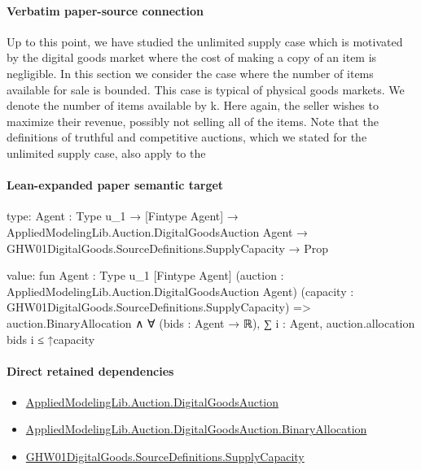 \documentclass[10pt]{article}
\begin{document}
\paragraph{Verbatim paper-source connection}
\begin{ReviewVerbatim}
Up to this point, we have studied the unlimited supply case which is motivated by the digital goods market where the cost of making a copy of an item is negligible. In this section we consider the case where the
number of items available for sale is bounded. This
case is typical of physical goods markets. We denote the number of items available by k. Here again,
the seller wishes to maximize their revenue, possibly
not selling all of the items. Note that the definitions of truthful and competitive auctions, which we
stated for the unlimited supply case, also apply to the
\end{ReviewVerbatim}



\paragraph{Lean-expanded paper semantic target}
\begin{ReviewVerbatim}
type:
{Agent : Type u_1} →
  [Fintype Agent] →
    AppliedModelingLib.Auction.DigitalGoodsAuction Agent → GHW01DigitalGoods.SourceDefinitions.SupplyCapacity → Prop

value:
fun {Agent : Type u_1} [Fintype Agent] (auction : AppliedModelingLib.Auction.DigitalGoodsAuction Agent)
    (capacity : GHW01DigitalGoods.SourceDefinitions.SupplyCapacity) =>
  auction.BinaryAllocation ∧ ∀ (bids : Agent → ℝ), ∑ i : Agent, auction.allocation bids i ≤ ↑capacity
\end{ReviewVerbatim}

\paragraph{Direct retained dependencies}
\begin{itemize}\raggedright
\item \hyperlink{governing-declaration-7d5372964da104c4}{Applied\allowbreak{}Modeling\allowbreak{}Lib.\allowbreak{}Auction.\allowbreak{}Digital\allowbreak{}Goods\allowbreak{}Auction}
\item \hyperlink{governing-declaration-db44fd9ee659d7f2}{Applied\allowbreak{}Modeling\allowbreak{}Lib.\allowbreak{}Auction.\allowbreak{}Digital\allowbreak{}Goods\allowbreak{}Auction.\allowbreak{}Binary\allowbreak{}Allocation}
\item \hyperlink{governing-declaration-b45673e2f2fa9536}{GHW01\allowbreak{}Digital\allowbreak{}Goods.\allowbreak{}Source\allowbreak{}Definitions.\allowbreak{}Supply\allowbreak{}Capacity}
\end{itemize}
\end{document}
